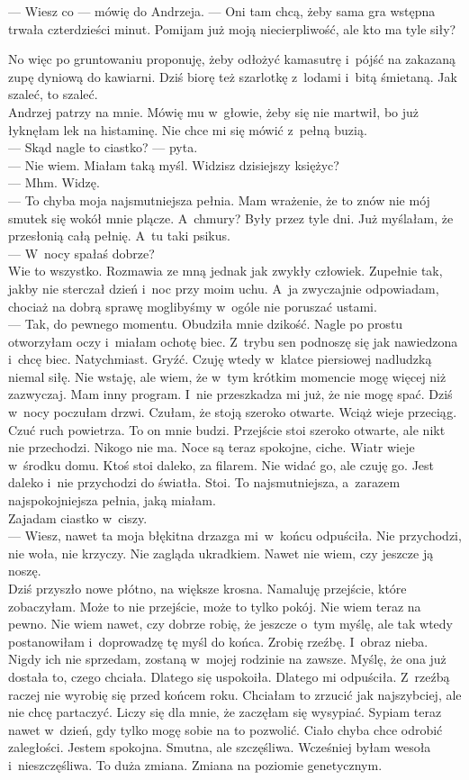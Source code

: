 \documentclass[9pt, a5paper]{memoir}
\begin{document}
--- Wiesz co --- mówię do Andrzeja. --- Oni tam chcą, żeby sama gra wstępna trwała czterdzieści minut. Pomijam już moją niecierpliwość, ale kto ma tyle siły?

No więc po gruntowaniu proponuję, żeby odłożyć kamasutrę i~pójść na zakazaną zupę dyniową do kawiarni. Dziś biorę też szarlotkę z~lodami i~bitą śmietaną. Jak szaleć, to szaleć.\\
Andrzej patrzy na mnie. Mówię mu w~głowie, żeby się nie martwił, bo już łyknęłam lek na histaminę. Nie chce mi się mówić z~pełną buzią.\\
--- Skąd nagle to ciastko? --- pyta.\\
--- Nie wiem. Miałam taką myśl. Widzisz dzisiejszy księżyc?\\
--- Mhm. Widzę.\\
--- To chyba moja najsmutniejsza pełnia. Mam wrażenie, że to znów nie mój smutek się wokół mnie plącze. A~chmury? Były przez tyle dni. Już myślałam, że przesłonią całą pełnię. A~tu taki psikus.\\
--- W~nocy spałaś dobrze?\\
Wie to wszystko. Rozmawia ze mną jednak jak zwykły człowiek. Zupełnie tak, jakby nie sterczał dzień i~noc przy moim uchu. A~ja zwyczajnie odpowiadam, chociaż na dobrą sprawę moglibyśmy w~ogóle nie poruszać ustami.\\
--- Tak, do pewnego momentu. Obudziła mnie dzikość. Nagle po prostu otworzyłam oczy i~miałam ochotę biec. Z~trybu sen podnoszę się jak nawiedzona i~chcę biec. Natychmiast. Gryźć. Czuję wtedy w~klatce piersiowej nadludzką niemal siłę. Nie wstaję, ale wiem, że w~tym krótkim momencie mogę więcej niż zazwyczaj. Mam inny program. I~nie przeszkadza mi już, że nie mogę spać. Dziś w~nocy poczułam drzwi. Czułam, że stoją szeroko otwarte. Wciąż wieje przeciąg. Czuć ruch powietrza. To on mnie budzi. Przejście stoi szeroko otwarte, ale nikt nie przechodzi. Nikogo nie ma. Noce są teraz spokojne, ciche. Wiatr wieje w~środku domu. Ktoś stoi daleko, za filarem. Nie widać go, ale czuję go. Jest daleko i~nie przychodzi do światła. Stoi. To najsmutniejsza, a~zarazem najspokojniejsza pełnia, jaką miałam.\\
Zajadam ciastko w~ciszy.\\
--- Wiesz, nawet ta moja błękitna drzazga mi~w~końcu odpuściła. Nie przychodzi, nie woła, nie krzyczy. Nie zagląda ukradkiem. Nawet nie wiem, czy jeszcze ją noszę.\\
Dziś przyszło nowe płótno, na większe krosna. Namaluję przejście, które zobaczyłam. Może to nie przejście, może to tylko pokój. Nie wiem teraz na pewno. Nie wiem nawet, czy dobrze robię, że jeszcze o~tym myślę, ale tak wtedy postanowiłam i~doprowadzę tę myśl do końca. Zrobię rzeźbę. I~obraz nieba. Nigdy ich nie sprzedam, zostaną w~mojej rodzinie na zawsze. Myślę, że ona już dostała to, czego chciała. Dlatego się uspokoiła. Dlatego mi odpuściła. Z~rzeźbą raczej nie wyrobię się przed końcem roku. Chciałam to zrzucić jak najszybciej, ale nie chcę partaczyć. Liczy się dla mnie, że zaczęłam się wysypiać. Sypiam teraz nawet w~dzień, gdy tylko mogę sobie na to pozwolić. Ciało chyba chce odrobić zaległości. Jestem spokojna. Smutna, ale szczęśliwa. Wcześniej byłam wesoła i~nieszczęśliwa. To duża zmiana. Zmiana na poziomie genetycznym.
\end{document}
